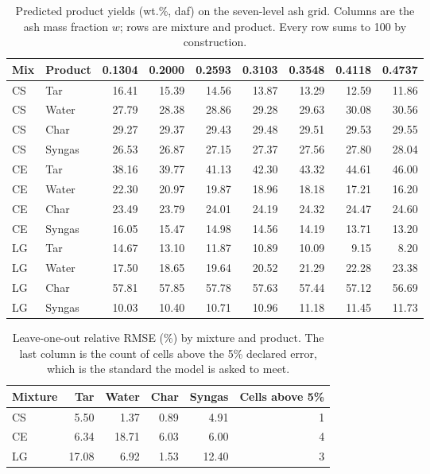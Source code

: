 \documentclass[withoutpreface,bwprint]{apmcmthesis}
\begin{document}
\begin{table}[htbp]\centering
\caption{Predicted product yields (wt.\%, daf) on the seven-level ash grid. Columns are the ash mass fraction $w$; rows are mixture and product. Every row sums to 100 by construction.}
\label{tab:q5}
{\small\setlength{\tabcolsep}{1.7pt}
\begin{tabular}{@{}llrrrrrrr@{}}
\toprule
Mix & Product & 0.1304 & 0.2000 & 0.2593 & 0.3103 & 0.3548 & 0.4118 & 0.4737\\
\midrule
CS & Tar & 16.41 & 15.39 & 14.56 & 13.87 & 13.29 & 12.59 & 11.86\\
CS & Water & 27.79 & 28.38 & 28.86 & 29.28 & 29.63 & 30.08 & 30.56\\
CS & Char & 29.27 & 29.37 & 29.43 & 29.48 & 29.51 & 29.53 & 29.55\\
CS & Syngas & 26.53 & 26.87 & 27.15 & 27.37 & 27.56 & 27.80 & 28.04\\
CE & Tar & 38.16 & 39.77 & 41.13 & 42.30 & 43.32 & 44.61 & 46.00\\
CE & Water & 22.30 & 20.97 & 19.87 & 18.96 & 18.18 & 17.21 & 16.20\\
CE & Char & 23.49 & 23.79 & 24.01 & 24.19 & 24.32 & 24.47 & 24.60\\
CE & Syngas & 16.05 & 15.47 & 14.98 & 14.56 & 14.19 & 13.71 & 13.20\\
LG & Tar & 14.67 & 13.10 & 11.87 & 10.89 & 10.09 & 9.15 & 8.20\\
LG & Water & 17.50 & 18.65 & 19.64 & 20.52 & 21.29 & 22.28 & 23.38\\
LG & Char & 57.81 & 57.85 & 57.78 & 57.63 & 57.44 & 57.12 & 56.69\\
LG & Syngas & 10.03 & 10.40 & 10.71 & 10.96 & 11.18 & 11.45 & 11.73\\
\bottomrule
\end{tabular}}
\end{table}

\begin{table}[htbp]\centering
\caption{Leave-one-out relative RMSE (\%) by mixture and product. The last column is the count of cells above the 5\% declared error, which is the standard the model is asked to meet.}
\label{tab:loo}
{\small\setlength{\tabcolsep}{2.2pt}
\begin{tabular}{@{}lrrrrr@{}}
\toprule
Mixture & Tar & Water & Char & Syngas & Cells above 5\%\\
\midrule
CS & 5.50 & 1.37 & 0.89 & 4.91 & 1\\
CE & 6.34 & 18.71 & 6.03 & 6.00 & 4\\
LG & 17.08 & 6.92 & 1.53 & 12.40 & 3\\
\bottomrule
\end{tabular}}
\end{table}
\end{document}
